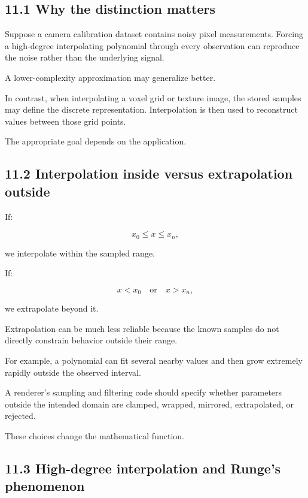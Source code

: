 \subsection{11.1 Why the distinction matters}\label{02-foundations-ii-ch028-why-the-distinction-matters}

Suppose a camera calibration dataset contains noisy pixel measurements. Forcing a high-degree interpolating polynomial through every observation can reproduce the noise rather than the underlying signal.

A lower-complexity approximation may generalize better.

In contrast, when interpolating a voxel grid or texture image, the stored samples may define the discrete representation. Interpolation is then used to reconstruct values between those grid points.

The appropriate goal depends on the application.

\subsection{11.2 Interpolation inside versus extrapolation outside}\label{02-foundations-ii-ch028-interpolation-inside-versus-extrapolation-outside}

If:

\[ x_0\le x\le x_n, \]

we interpolate within the sampled range.

If:

\[ x<x_0 \quad\text{or}\quad x>x_n, \]

we extrapolate beyond it.

Extrapolation can be much less reliable because the known samples do not directly constrain behavior outside their range.

For example, a polynomial can fit several nearby values and then grow extremely rapidly outside the observed interval.

A renderer's sampling and filtering code should specify whether parameters outside the intended domain are clamped, wrapped, mirrored, extrapolated, or rejected.

These choices change the mathematical function.

\subsection{11.3 High-degree interpolation and Runge's phenomenon}\label{02-foundations-ii-ch028-high-degree-interpolation-and-runges-phenomenon}

